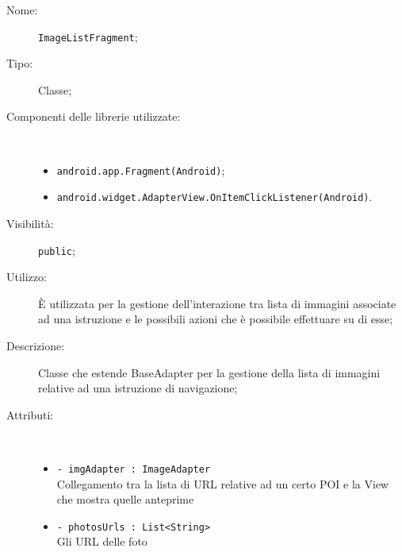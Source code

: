 \documentclass[../DefinizioneDiProdotto.tex]{subfiles}
\begin{document}
\begin{description}
	\item[Nome:] \texttt{ImageListFragment};
	\item[Tipo:] Classe;
	\item[Componenti delle librerie utilizzate:] \
	\begin{itemize}
		\item \texttt{android.app.Fragment(Android)};
		
		\item \texttt{android.widget.AdapterView.OnItemClickListener(Android)}.
		
	\end{itemize}
	\item[Visibilità:] \texttt{public};
	\item[Utilizzo:] È utilizzata per la gestione dell'interazione tra lista di immagini associate ad una istruzione e le possibili azioni che è possibile effettuare su di esse;
	\item[Descrizione:] Classe che estende BaseAdapter per la gestione della lista di immagini relative ad una istruzione di navigazione;
	\item[Attributi:] \
	\begin{itemize}
		\item \texttt{- imgAdapter : ImageAdapter}\\
		Collegamento tra la lista di URL relative ad un certo POI e la View che mostra quelle anteprime
		
		\item \texttt{- photosUrls : List<String>}\\
		Gli URL delle foto
		

\end{itemize}
\end{description}
\end{document}
